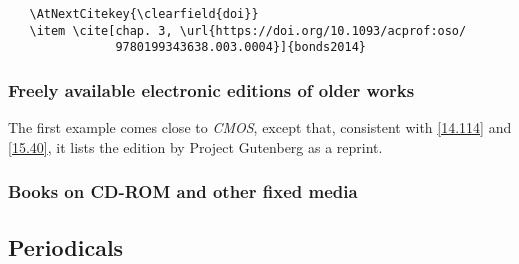 \documentclass[11pt,letterpaper,oneside]{article}
\begin{document}
\begin{verbatim}
   \AtNextCitekey{\clearfield{doi}}
   \item \cite[chap. 3, \url{https://doi.org/10.1093/acprof:oso/
               9780199343638.003.0004}]{bonds2014}
\end{verbatim}

\begin{citebib}
\item \cite[chap. 3, \url{https://doi.org/10.1093/acprof:oso/9780199343638.003.0004}]{bonds2014}
\item \cite[59]{lystra2004}
\item \cite[chap. 11, \url{https://doi.org/10.1093/acprof:oso/9780199343638.003.0012}]{bonds2014}
\item \cite[60--61]{lystra2004}
\end{citebib}

\subsubsection{Freely available electronic editions of older works}

The first example comes close to \textit{CMOS}, except that,
consistent with \ref{14.114} and \ref{15.40}, it lists the edition by
Project Gutenberg as a reprint.

\begin{citebib}
\item \cite[bk. 6, chap. 1]{james2008}
\item \cite[1:243]{james1909}
\end{citebib}

\subsubsection{Books on CD-ROM and other fixed media}
\label{14.163}

\begin{citebib}
\item \cite*[1.4]{chicago2003}
\end{citebib}

\setcounter{subsection}{5}
\subsection{Periodicals}
\setcounter{subsection}{14}
\end{document}
